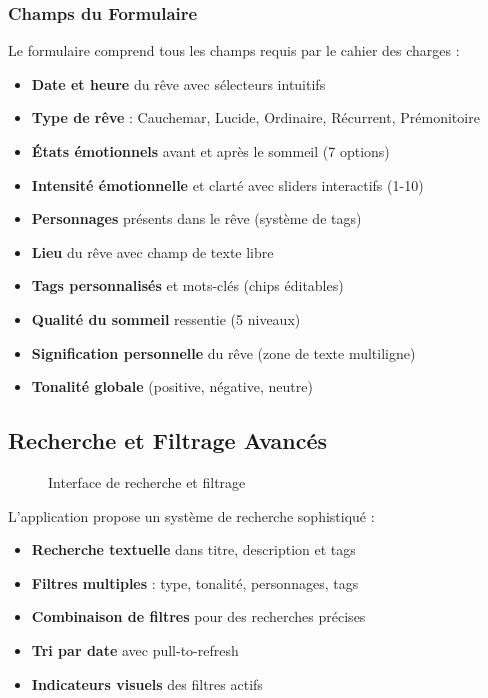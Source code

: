 \documentclass[12pt,a4paper]{article}
\begin{document}
\subsubsection{Champs du Formulaire}

Le formulaire comprend tous les champs requis par le cahier des charges :

\begin{itemize}
    \item \textbf{Date et heure} du rêve avec sélecteurs intuitifs
    \item \textbf{Type de rêve} : Cauchemar, Lucide, Ordinaire, Récurrent, Prémonitoire
    \item \textbf{États émotionnels} avant et après le sommeil (7 options)
    \item \textbf{Intensité émotionnelle} et clarté avec sliders interactifs (1-10)
    \item \textbf{Personnages} présents dans le rêve (système de tags)
    \item \textbf{Lieu} du rêve avec champ de texte libre
    \item \textbf{Tags personnalisés} et mots-clés (chips éditables)
    \item \textbf{Qualité du sommeil} ressentie (5 niveaux)
    \item \textbf{Signification personnelle} du rêve (zone de texte multiligne)
    \item \textbf{Tonalité globale} (positive, négative, neutre)
\end{itemize}

\subsection{Recherche et Filtrage Avancés}

\begin{figure}[H]
    \centering
    \caption{Interface de recherche et filtrage}
\end{figure}

L'application propose un système de recherche sophistiqué :

\begin{itemize}
    \item \textbf{Recherche textuelle} dans titre, description et tags
    \item \textbf{Filtres multiples} : type, tonalité, personnages, tags
    \item \textbf{Combinaison de filtres} pour des recherches précises
    \item \textbf{Tri par date} avec pull-to-refresh
    \item \textbf{Indicateurs visuels} des filtres actifs
\end{itemize}
\end{document}
